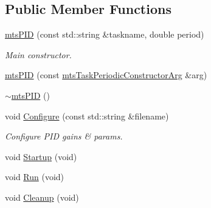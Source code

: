 \subsection*{Public Member Functions}
\begin{DoxyCompactItemize}
\item 
\hyperlink{classmts_p_i_d_ae6dfe083c5e5a696a6b005fda4d6cca6}{mts\+P\+I\+D} (const std\+::string \&taskname, double period)
\begin{DoxyCompactList}\small\item\em Main constructor. \end{DoxyCompactList}\item 
\hyperlink{classmts_p_i_d_a5382b49f6fbf4bdf80eae85e23b92abf}{mts\+P\+I\+D} (const \hyperlink{classmts_task_periodic_constructor_arg}{mts\+Task\+Periodic\+Constructor\+Arg} \&arg)
\item 
\hyperlink{classmts_p_i_d_abf4c7e2ceab5df1303764568d7234c5b}{$\sim$mts\+P\+I\+D} ()
\item 
void \hyperlink{classmts_p_i_d_a5a41aeb520a9007ecc12a2abded5bac5}{Configure} (const std\+::string \&filename)
\begin{DoxyCompactList}\small\item\em Configure P\+I\+D gains \& params. \end{DoxyCompactList}\item 
void \hyperlink{classmts_p_i_d_a2cea3d1dbc3ab7218ee00d67216a3c95}{Startup} (void)
\item 
void \hyperlink{classmts_p_i_d_a43f5e34d7a45a19fb9f2fa8685303e2e}{Run} (void)
\item 
void \hyperlink{classmts_p_i_d_acfd09cc46b2def93f7df99f2bd68bb49}{Cleanup} (void)
\end{DoxyCompactItemize}
